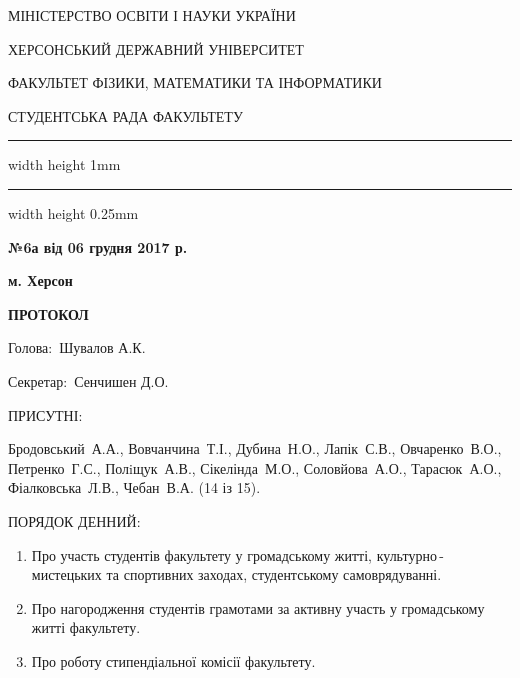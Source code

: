 \documentclass[
	a4paper,
	12pt,
	oneside,
	draft
]{extreport}
\newcommand{\heading}{\begin{center}
\parindent=0cm\parskip=-0.1cm\bfseries\footnotesize
\par МІНІСТЕРСТВО ОСВІТИ І НАУКИ УКРАЇНИ
\par ХЕРСОНСЬКИЙ ДЕРЖАВНИЙ УНІВЕРСИТЕТ
\par ФАКУЛЬТЕТ ФІЗИКИ, МАТЕМАТИКИ ТА ІНФОРМАТИКИ
\parskip=-0.2cm\par\large СТУДЕНТСЬКА РАДА ФАКУЛЬТЕТУ
\par\hrule width \hsize height 1mm \kern 0.25mm \hrule width \hsize height 0.25mm
\end{center}}
\newcommand{\Requisites}[4]{\par\noindent
\begin{minipage}[t]{80mm}
	\begin{minipage}[t]{\textwidth}
		{\par\noindent\textbf{№#1 від #2}}
	\end{minipage}
	\par	
	\begin{minipage}[t]{\textwidth}
		{\par\noindent #3}	
	\end{minipage}
\end{minipage}
\hfill
\begin{minipage}[t]{60mm}
	\par\noindent #4
\end{minipage}
}
\newcommand{\Attendees}[1]{{\par\noindent ПРИСУТНІ: \par #1}}
\newcommand{\topic}[1]{\item #1}
\newenvironment{protocolAgenda}
	{\bigskip\par\noindent ПОРЯДОК ДЕННИЙ:
		\begin{enumerate}[topsep=0pt,itemsep=-1ex,partopsep=1ex,parsep=1ex]}
	{\end{enumerate}}
\begin{document}
\pagestyle{empty}
\heading
\Requisites
{6а}
{06 грудня 2017 р.}
{}{\hfill\bfseries  м. Херсон}

\begin{center}\textbf{ПРОТОКОЛ}\end{center}

\par\noindent Голова:~Шувалов А.К.
\par\noindent Секретар:~Сенчишен Д.О.

\Attendees{
Бродовський~А.А.,
Вовчанчина~Т.І.,
Дубина~Н.О.,
Лапік~С.В.,
Овчаренко~В.О.,
Петренко~Г.С.,
Полiщук~А.В.,
Сікелінда~М.О.,
Соловйова~А.О.,
Тарасюк~А.О.,
Фіалковська~Л.В.,
Чебан~В.А.
(14 із 15).}

\begin{protocolAgenda}
\topic{Про участь студентів факультету у громадському житті, культурно\,-\,мистецьких та спортивних заходах, студентському самоврядуванні.}
\topic{Про нагородження студентів грамотами за активну участь у громадському житті факультету.}
\topic{Про роботу стипендіальної комісії факультету.}
\end{protocolAgenda}
\end{document}
